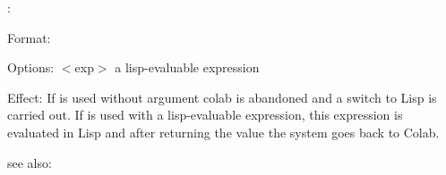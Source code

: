 \colab{} \lisp:

Format: 

Options: $<$exp$>$ a lisp-evaluable expression

Effect: If  is used without argument colab is abandoned and a
        switch to Lisp is carried out.
        If  is used with a lisp-evaluable expression, this 
        expression is evaluated in Lisp and after returning the value 
        the system goes back to Colab. 

see also: \colab